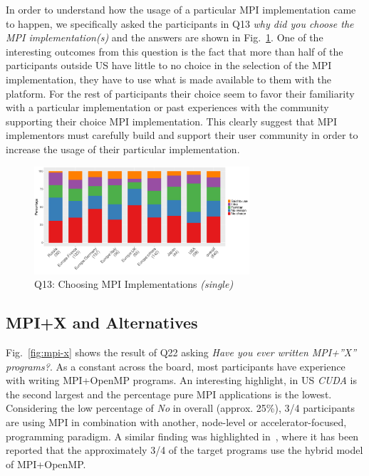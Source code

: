 \documentclass[preprint,5p,times]{elsarticle}
\def\myquote#1{{\it #1}}
\newcommand{\revision}[2]{{\color{blue}#2}}
\begin{document}
In order to understand how the usage of a particular MPI implementation came to
happen, we specifically asked the participants in Q13 \myquote{why did you
choose the MPI implementation(s)} and the answers are shown in
Fig.~\ref{fig:choosing-implementation}.
%
One of the interesting outcomes from this question is the fact that more than
half of the participants outside US have little to no choice in the selection of
the MPI implementation, they have to use what is made available to them with the
platform. For the rest of participants their choice seem to favor their
familiarity with a particular implementation or past experiences with the
community supporting their choice MPI implementation.
%
This clearly suggest that MPI implementors must carefully build and support
their \revision{users}{user} community in order to increase the usage of their particular
implementation.


  \begin{figure}[tb]
    \begin{center}
      \includegraphics[width=8.0cm]{R-scripts/Q13.pdf}
      \vspace{-2mm}
      \caption{Q13: Choosing MPI Implementations {\it(single)}}
      \label{fig:choosing-implementation}
    \end{center}
  \end{figure}

\subsection{MPI+X and Alternatives}

Fig.~\ref{fig:mpi-x} shows the result of Q22 asking \myquote{Have you ever
written MPI+''X'' programs?}. As a constant across the board, most participants
have \revision{experienced}{experience with} writing MPI+OpenMP programs. An interesting highlight, in US
\myquote{CUDA} is the second largest and the percentage pure MPI applications is
the lowest. Considering the low percentage of \myquote{No} in overall (approx.
25\%), 3/4 participants are using MPI in combination with another, node-level or
accelerator-focused, programming paradigm. A similar finding was highlighted
in~\cite{10.1145/3295500.3356176}, where it has been reported that the
approximately 3/4 of the target programs use the hybrid model of MPI+OpenMP.
\end{document}
